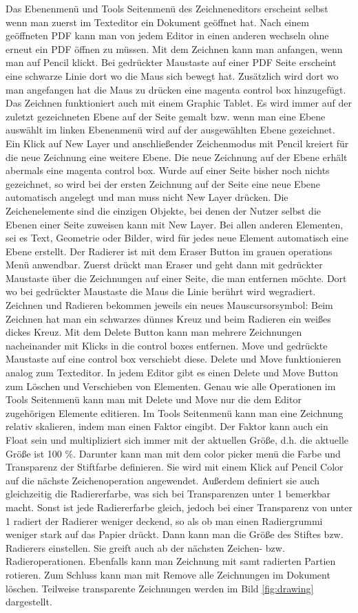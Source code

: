 Das Ebenenmenü und Tools Seitenmenü des Zeichneneditors erscheint selbst wenn man zuerst im Texteditor ein Dokument geöffnet hat. Nach einem geöffneten PDF kann man von jedem Editor in einen anderen wechseln ohne erneut ein PDF öffnen zu müssen. Mit dem Zeichnen kann man anfangen, wenn man auf Pencil klickt. Bei gedrückter Maustaste auf einer PDF Seite erscheint eine schwarze Linie dort wo die Maus sich bewegt hat. Zusätzlich wird dort wo man angefangen hat die Maus zu drücken eine magenta control box hinzugefügt. Das Zeichnen funktioniert auch mit einem Graphic Tablet. Es wird immer auf der zuletzt gezeichneten Ebene auf der Seite gemalt bzw. wenn man eine Ebene auswählt im linken Ebenenmenü wird auf der ausgewählten Ebene gezeichnet. Ein Klick auf New Layer und anschließender Zeichenmodus mit Pencil kreiert für die neue Zeichnung eine weitere Ebene. Die neue Zeichnung auf der Ebene erhält abermals eine magenta control box. Wurde auf einer Seite bisher noch nichts gezeichnet, so wird bei der ersten Zeichnung auf der Seite eine neue Ebene automatisch angelegt und man muss nicht New Layer drücken. Die Zeichenelemente sind die einzigen Objekte, bei denen der Nutzer selbst die Ebenen einer Seite zuweisen kann mit New Layer. Bei allen anderen Elementen, sei es Text, Geometrie oder Bilder, wird für jedes neue Element automatisch eine Ebene erstellt. Der Radierer ist  mit dem Eraser Button im grauen operations Menü anwendbar. Zuerst drückt man Eraser und geht dann mit gedrückter Maustaste über die Zeichnungen auf einer Seite, die man entfernen möchte. Dort wo bei gedrückter Maustaste die Maus die Linie berührt wird wegradiert. Zeichnen und Radieren bekommen jeweils ein neues Mauscursorsymbol: Beim Zeichnen hat man ein schwarzes dünnes Kreuz und beim Radieren ein weißes dickes Kreuz. Mit dem Delete Button kann man mehrere Zeichnungen nacheinander mit Klicks in die control boxes entfernen. Move und gedrückte Maustaste auf eine control box verschiebt diese. Delete und Move funktionieren analog zum Texteditor. In jedem Editor gibt es einen Delete und Move Button zum Löschen und Verschieben von Elementen. Genau wie alle Operationen im Tools Seitenmenü kann man mit Delete und Move nur die dem Editor zugehörigen Elemente editieren. Im Tools Seitenmenü kann man eine Zeichnung relativ skalieren, indem man einen Faktor eingibt. Der Faktor kann auch ein Float sein und multipliziert sich immer mit der aktuellen Größe, d.h. die aktuelle Größe ist 100 \%. Darunter kann man mit dem color picker menü die Farbe und Transparenz der Stiftfarbe definieren. Sie wird mit einem Klick auf Pencil Color auf die nächste Zeichenoperation angewendet. Außerdem definiert sie auch gleichzeitig die Radiererfarbe, was sich bei Transparenzen unter 1 bemerkbar macht. Sonst ist jede Radiererfarbe gleich, jedoch bei einer Transparenz von unter 1 radiert der Radierer weniger deckend, so als ob man einen Radiergrummi weniger stark auf das Papier drückt. Dann kann man die Größe des Stiftes bzw. Radierers einstellen. Sie greift auch ab der nächsten Zeichen- bzw. Radieroperationen. Ebenfalls kann man Zeichnung mit samt radierten Partien rotieren. Zum Schluss kann man mit Remove alle Zeichnungen im Dokument löschen. Teilweise transparente Zeichnungen werden im Bild \ref{fig:drawing} dargestellt. 

